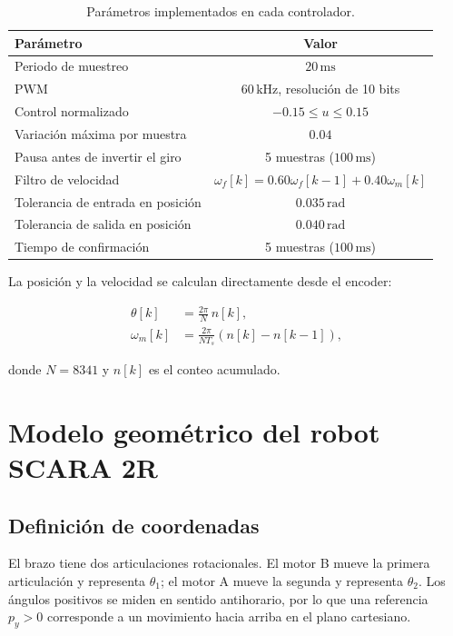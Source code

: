 \documentclass[11pt,a4paper]{article}
\begin{document}
\begin{table}[H]
\centering
\caption{Parámetros implementados en cada controlador.}
\begin{tabular}{lc}
\toprule
\textbf{Parámetro} & \textbf{Valor} \\
\midrule
Periodo de muestreo & $20\,\mathrm{ms}$ \\
PWM & $60\,\mathrm{kHz}$, resolución de 10 bits \\
Control normalizado & $-0.15\leq u\leq 0.15$ \\
Variación máxima por muestra & $0.04$ \\
Pausa antes de invertir el giro & 5 muestras ($100\,\mathrm{ms}$) \\
Filtro de velocidad & $\omega_f[k]=0.60\omega_f[k-1]+0.40\omega_m[k]$ \\
Tolerancia de entrada en posición & $0.035\,\mathrm{rad}$ \\
Tolerancia de salida en posición & $0.040\,\mathrm{rad}$ \\
Tiempo de confirmación & 5 muestras ($100\,\mathrm{ms}$) \\
\bottomrule
\end{tabular}
\end{table}

La posición y la velocidad se calculan directamente desde el encoder:

\begin{align}
\theta[k]&=\frac{2\pi}{N}\,n[k],\\
\omega_m[k]&=\frac{2\pi}{N T_s}\left(n[k]-n[k-1]\right),
\end{align}

donde $N=8341$ y $n[k]$ es el conteo acumulado.

\section{Modelo geométrico del robot SCARA 2R}

\subsection{Definición de coordenadas}

El brazo tiene dos articulaciones rotacionales. El motor B mueve la primera articulación y representa $\theta_1$; el motor A mueve la segunda y representa $\theta_2$. Los ángulos positivos se miden en sentido antihorario, por lo que una referencia $p_y>0$ corresponde a un movimiento hacia arriba en el plano cartesiano.
\end{document}
